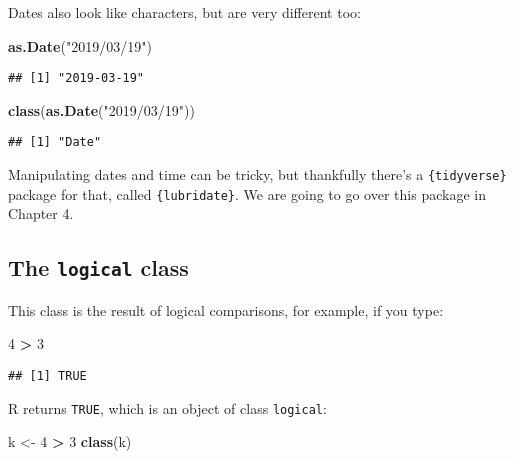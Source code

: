 \documentclass[
]{article}
\newenvironment{Shaded}{\begin{snugshade}}{\end{snugshade}}
\newcommand{\DecValTok}[1]{\textcolor[rgb]{0.00,0.00,0.81}{#1}}
\newcommand{\KeywordTok}[1]{\textcolor[rgb]{0.13,0.29,0.53}{\textbf{#1}}}
\newcommand{\NormalTok}[1]{#1}
\newcommand{\OperatorTok}[1]{\textcolor[rgb]{0.81,0.36,0.00}{\textbf{#1}}}
\newcommand{\StringTok}[1]{\textcolor[rgb]{0.31,0.60,0.02}{#1}}
\begin{document}
Dates also look like characters, but are very different too:

\begin{Shaded}
\begin{Highlighting}[]
\KeywordTok{as.Date}\NormalTok{(}\StringTok{"2019/03/19"}\NormalTok{)}
\end{Highlighting}
\end{Shaded}

\begin{verbatim}
## [1] "2019-03-19"
\end{verbatim}

\begin{Shaded}
\begin{Highlighting}[]
\KeywordTok{class}\NormalTok{(}\KeywordTok{as.Date}\NormalTok{(}\StringTok{"2019/03/19"}\NormalTok{))}
\end{Highlighting}
\end{Shaded}

\begin{verbatim}
## [1] "Date"
\end{verbatim}

Manipulating dates and time can be tricky, but thankfully there's a \texttt{\{tidyverse\}} package for that,
called \texttt{\{lubridate\}}. We are going to go over this package in Chapter 4.

\hypertarget{the-logical-class}{%
\subsection{\texorpdfstring{The \texttt{logical} class}{The logical class}}\label{the-logical-class}}

This class is the result of logical comparisons, for example, if you type:

\begin{Shaded}
\begin{Highlighting}[]
\DecValTok{4} \OperatorTok{\textgreater{}}\StringTok{ }\DecValTok{3}
\end{Highlighting}
\end{Shaded}

\begin{verbatim}
## [1] TRUE
\end{verbatim}

R returns \texttt{TRUE}, which is an object of class \texttt{logical}:

\begin{Shaded}
\begin{Highlighting}[]
\NormalTok{k \textless{}{-}}\StringTok{ }\DecValTok{4} \OperatorTok{\textgreater{}}\StringTok{ }\DecValTok{3}
\KeywordTok{class}\NormalTok{(k)}
\end{Highlighting}
\end{Shaded}
\end{document}
